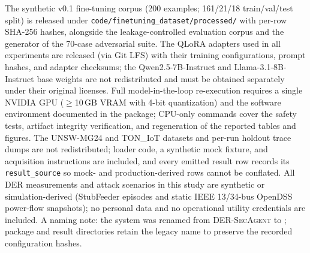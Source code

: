 The synthetic v0.1 fine-tuning corpus (200 examples; 161/21/18
train/val/test split) is released under
\texttt{code/finetuning\_dataset/processed/} with per-row SHA-256 hashes,
alongside the leakage-controlled evaluation corpus and the generator of the
70-case adversarial suite. The QLoRA adapters used in all experiments are
released (via Git LFS) with their training configurations, prompt hashes,
and adapter checksums; the Qwen2.5-7B-Instruct and Llama-3.1-8B-Instruct
base weights are not redistributed and must be obtained separately under
their original licenses. Full model-in-the-loop re-execution requires a
single NVIDIA GPU ($\geq$10\,GB VRAM with 4-bit quantization) and the
software environment documented in the package; CPU-only commands cover the
safety tests, artifact integrity verification, and regeneration of the
reported tables and figures. The UNSW-MG24 and TON\_IoT datasets and per-run
holdout trace dumps are not redistributed; loader code, a synthetic mock
fixture, and acquisition instructions are included, and every emitted result
row records its \texttt{result\_source} so mock- and production-derived rows
cannot be conflated. All DER measurements and attack scenarios in this study
are synthetic or simulation-derived (StubFeeder episodes and static IEEE
13/34-bus OpenDSS power-flow snapshots); no personal data and no operational
utility credentials are included. A naming note: the system was renamed from
\textsc{DER-SecAgent} to \ours{}; package and result directories retain the
legacy name to preserve the recorded configuration hashes.
\par\endgroup
